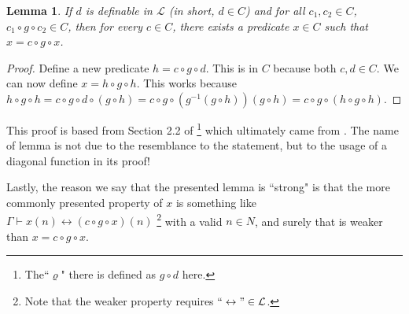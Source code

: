 \documentclass{article}
\newtheorem{lemma}[theorem]{Lemma}
\begin{document}
\begin{lemma}
If $d$ is definable in $\mathcal{L}$ (in short, $d \in C$) and for all $c_1, c_2 \in C$, $c_1 \circ g \circ c_2 \in C$, then for every $c \in C$, there exists a predicate $x \in C$ such that $x = c \circ g \circ x$.
\end{lemma}
\begin{proof}
Define a new predicate $h = c \circ g \circ d$. This is in $C$ because both $c, d \in C$. We can now define $x = h \circ g \circ h$. This works because $h \circ g \circ h = c \circ g \circ d \circ (g \circ h) = c \circ g \circ (g^{-1}(g \circ h))(g \circ h) = c \circ g \circ (h \circ g \circ h)$.
\end{proof}

This proof is based from Section 2.2 of \cite{salehi} \footnote{The``$\varrho$" there is defined as $g \circ d$ here.} which ultimately came from \cite{jeroslow}. The name of lemma is not due to the resemblance to the statement, but to the usage of a diagonal function in its proof!

Lastly, the reason we say that the presented lemma is ``strong" is that the more commonly presented property of $x$ is something like $\Gamma \vdash x(n) \leftrightarrow (c \circ g \circ x)(n)$ \footnote{Note that the weaker property requires $``\leftrightarrow" \in \mathcal{L}$.} with a valid $n \in N$, and surely that is weaker than $x = c \circ g \circ x$.



\end{document}
